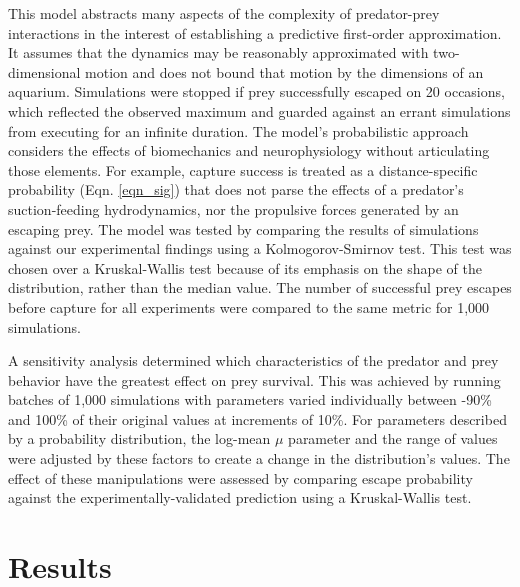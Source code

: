 \documentclass[]{rsos}%
\begin{document}
This model abstracts many aspects of the complexity of predator-prey interactions in the interest of establishing a predictive first-order approximation.
It assumes that the dynamics may be reasonably approximated with two-dimensional motion and does not bound that motion by the dimensions of an aquarium. 
Simulations were stopped if prey successfully escaped on 20 occasions, which reflected the observed maximum and guarded against an errant simulations from executing for an infinite duration.
The model's probabilistic approach considers the effects of biomechanics and neurophysiology without articulating those elements.
For example, capture success is treated as a distance-specific probability (Eqn. \ref{eqn_sig}) that does not parse the effects of a predator's suction-feeding hydrodynamics, nor the propulsive forces generated by an escaping prey.
The model was tested by comparing the results of simulations against our experimental findings using a Kolmogorov-Smirnov test. 
This test was chosen over a Kruskal-Wallis test because of its emphasis on the shape of the distribution, rather than the median value.  
The number of successful prey escapes before capture for all experiments were compared to the same metric for 1,000 simulations.  

A sensitivity analysis determined which characteristics of the predator and prey behavior have the greatest effect on prey survival. 
This was achieved by running batches of 1,000 simulations with parameters varied individually between -90\% and 100\% of their original values at increments of 10\%.
For parameters described by a probability distribution, the log-mean $\mu$ parameter and the range of values were adjusted by these factors to create a change in the distribution's values.
The effect of these manipulations were assessed by comparing escape probability against the experimentally-validated prediction using a Kruskal-Wallis test. 


\section{Results} %
\end{document}
